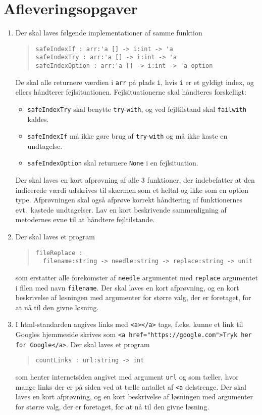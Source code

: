 \documentclass[a4paper,12pt]{article}
\begin{document}
\section*{Afleveringsopgaver}
\begin{enumerate}[label=9i.\arabic*,start=0]
\item Der skal laves følgende implementationer af samme funktion
  \begin{quote}
    \mbox{\lstinline!safeIndexIf : arr:'a [] -> i:int -> 'a!}
    \\\mbox{\lstinline!safeIndexTry : arr:'a [] -> i:int -> 'a!}
    \\\mbox{\lstinline!safeIndexOption : arr:'a [] -> i:int -> 'a option!}
  \end{quote}
  De skal alle returnere værdien i \lstinline!arr! på plads \lstinline!i!, hvis \lstinline!i! er et gyldigt index, og ellers håndterer fejlsituationen.  Fejlsituationerne skal håndteres forskelligt:
  \begin{itemize}
  \item \lstinline!safeIndexTry! skal benytte \lstinline!try!-\lstinline!with!, og ved fejltilstand skal \lstinline!failwith! kaldes. 
  \item \lstinline!safeIndexIf! må ikke gøre brug af \lstinline!try!-\lstinline!with! og må ikke kaste en undtagelse. 
  \item \lstinline!safeIndexOption! skal returnere \lstinline!None! i en fejlsituation. 
  \end{itemize}
   Der skal laves en kort afprøvning af alle 3 funktioner, der indebefatter at den indicerede værdi udskrives til skærmen som et heltal og ikke som en option type. Afprøvningen skal også afprøve korrekt håndtering af funktionernes evt.\ kastede undtagelser.  Lav en kort beskrivende sammenligning af metodernes evne til at håndtere fejltilstande.
 \item Der skal laves et program
  \begin{quote}
    \lstinline!fileReplace :!
    \\\noindent\lstinline!  filename:string -> needle:string -> replace:string -> unit!
  \end{quote}
  som erstatter alle forekomster af \lstinline!needle! argumentet med \lstinline!replace! argumentet i filen med navn \lstinline!filename!. Der skal laves en kort afprøvning, og en kort beskrivelse af løsningen med argumenter for større valg, der er foretaget, for at nå til den givne løsning.
\item I html-standarden angives links med \lstinline!<a></a>! tags, f.eks. kunne et link til Googles hjemmeside skrives som \lstinline!<a href="https://google.com">Tryk her for Google</a>!. Der skal laves et program
  \begin{quote}
    \mbox{\lstinline!countLinks : url:string -> int!}
  \end{quote}
  som henter internetsiden angivet med argument \lstinline!url! og som tæller, hvor mange links der er på siden ved at tælle antallet af \lstinline!<a! delstrenge. Der skal laves en kort afprøvning, og en kort beskrivelse af løsningen med argumenter for større valg, der er foretaget, for at nå til den givne løsning.
\end{enumerate}
\end{document}
